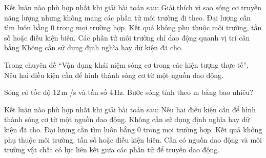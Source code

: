 \begin{ex}
Kết luận nào phù hợp nhất khi giải bài toán sau: Giải thích vì sao sóng cơ truyền năng lượng nhưng không mang các phần tử môi trường đi theo.
\choice
{Đại lượng cần tìm luôn bằng 0 trong mọi trường hợp.}
{Kết quả không phụ thuộc môi trường, tần số hoặc điều kiện biên.}
{\True Các phần tử môi trường chỉ dao động quanh vị trí cân bằng}
{Không cần sử dụng định nghĩa hay dữ kiện đã cho.}
\end{ex}

\begin{ex}
Trong chuyên đề “Vận dụng khái niệm sóng cơ trong các hiện tượng thực tế”, Nêu hai điều kiện cần để hình thành sóng cơ từ một nguồn dao động.
\choiceTF

\end{ex}

\begin{ex}
Sóng có tốc độ $12\,\text{m}$ /s và tần số $4\,\text{Hz}$. Bước sóng tính theo m bằng bao nhiêu?
\end{ex}

\begin{ex}
Kết luận nào phù hợp nhất khi giải bài toán sau: Nêu hai điều kiện cần để hình thành sóng cơ từ một nguồn dao động.
\choice
{Không cần sử dụng định nghĩa hay dữ kiện đã cho.}
{Đại lượng cần tìm luôn bằng 0 trong mọi trường hợp.}
{Kết quả không phụ thuộc môi trường, tần số hoặc điều kiện biên.}
{\True Cần có nguồn dao động và môi trường vật chất có lực liên kết giữa các phần tử để truyền dao động.}
\end{ex}

